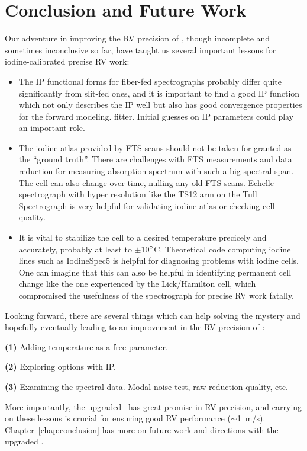 


 

 
\section{Conclusion and Future Work}\label{het:sec:conclusion}
 
Our adventure in improving the RV precision of \het, though incomplete
and sometimes inconclusive so far, have taught us several important
lessons for iodine-calibrated precise RV work:

\begin{itemize}
  \item The IP functional forms for fiber-fed spectrographs probably
differ quite significantly from slit-fed ones, and it is important to
find a good IP function which not only describes the IP well but also
has good convergence properties for the forward modeling.
fitter. Initial guesses on IP parameters could play an important role.
  \item The iodine atlas provided by FTS scans should not be taken for
granted as the ``ground truth''. There are challenges with FTS
measurements and data reduction for measuring absorption spectrum with
such a big spectral span. The cell can also change over time, nulling
any old FTS scans. Echelle spectrograph with hyper resolution like the
TS12 arm on the Tull Spectrograph is very helpful for validating
iodine atlas or checking cell quality.
  \item It is vital to stabilize the cell to a desired temperature
precicely and accurately, probably at least to
$\pm$10$^{\circ}$C. Theoretical code computing iodine lines such as
IodineSpec5 is helpful for diagnosing problems with iodine cells. One
can imagine that this can also be helpful in identifying permanent
cell change like the one experienced by the Lick/Hamilton cell, which
compromised the usefulness of the spectrograph for precise RV work
fatally.
\end{itemize}

Looking forward, there are several things which can help solving the
mystery and hopefully eventually leading to an improvement in the RV
precision of \het:

{\bf (1)} Adding temperature as a free parameter.

{\bf (2)} Exploring options with IP.

{\bf (3)} Examining the spectral data. Modal noise test, raw reduction
quality, etc.

More importantly, the upgraded \het\ has great promise in RV
precision, and carrying on these lessons is crucial for ensuring good
RV performance ($\sim$1~m/s). Chapter~\ref{chap:conclusion} has more
on future work and directions with the upgraded \het.



